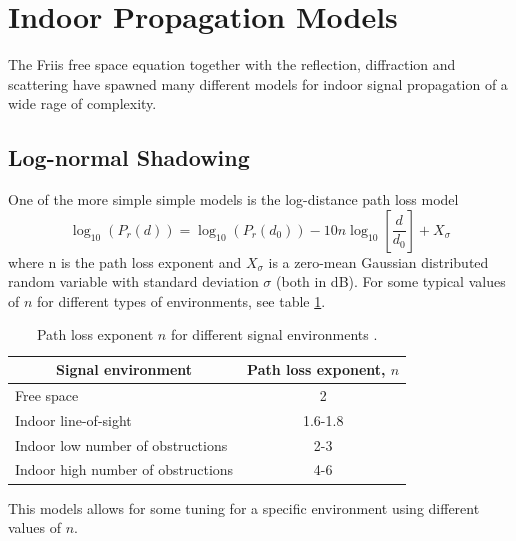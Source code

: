 \documentclass{LTHthesis}
\begin{document}
\section{Indoor Propagation Models}
%
The Friis free space equation together with the reflection, diffraction and scattering have spawned many different models for indoor signal propagation of a wide rage of complexity.
%
\subsection{Log-normal Shadowing} 
One of the more simple simple models is the log-distance path loss model
%
\begin{equation}
\log_{10}({P_r(d)})=\log_{10}({P_r(d_0)})-10n\log_{10}\left[{\frac{d}{d_0}}\right] + X_\sigma
\end{equation} 
%
where n is the path loss exponent and  $X_\sigma$ is a zero-mean Gaussian distributed random variable with standard deviation $\sigma$ (both in dB). For some typical values of $n$ for different types of environments, see table \ref{table:path_loss_n}.
%
\begin{table}
\begin{center}
\begin{tabular}{| l | c |}
\hline
\multicolumn{1}{|c|}{Signal environment} & Path loss exponent, $n$ \\
\hline
\hline
Free space & 2 \\
\hline
Indoor line-of-sight & 1.6-1.8 \\
\hline
Indoor low number of obstructions & 2-3 \\
\hline
Indoor high number of obstructions & 4-6 \\
\hline
\end{tabular}
\end{center}
\caption{Path loss exponent $n$ for different signal environments \cite{rappaport96}.}
\label{table:path_loss_n}
\end{table}
%
This models allows for some tuning for a specific environment using different values of $n$.
\end{document}
